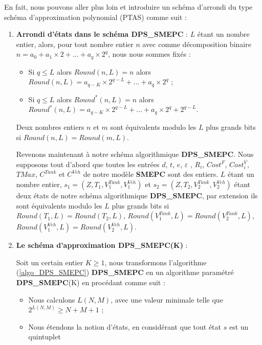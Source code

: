 En fait, nous pouvons aller plus loin et introduire un schéma d'arrondi du type schéma d'approximation polynomial (PTAS) comme suit : 
\begin{enumerate}
	\item \textbf{Arrondi d'états dans le schéma \textbf{DPS\_SMEPC}} : $L$ étant un nombre entier, alors, pour tout nombre entier $n$ avec comme décomposition binaire $n = a_0 + a_1 \times 2 + \dots + a_q \times 2^q$, nous nous sommes fixés :
	\begin{itemize}[label=$\square$]
		\item Si $q\leq L$ alors $Round(n, L)=n$ alors $Round(n, L)=a_{q-K}\times 2^{q-L}+ \dots + a_q\times 2^q$ ;
		\item Si $q\leq L$ alors $Round^*(n, L)=n$ alors $Round^*(n, L)=a_{q-K}\times 2^{q-L}+ \dots + a_q\times 2^q+2^{q-L}$.
	\end{itemize}
	Deux nombres entiers $n$ et $m$ sont équivalents modulo les $L$ plus grands bits si $Round(n, L) = Round(m, L)$.
	
	Revenons maintenant à notre schéma algorithmique \textbf{DPS\_SMEPC}. Nous supposons tout d'abord que toutes les entrées $d$, $t$, $e$, $\varepsilon$ , $R_i$, $Cost^F$, $Cost^V_i$, $TMax$, $C^{Tank}$ et $C^{Veh}$ de notre modèle \textbf{SMEPC} sont des entiers. $L$ étant un nombre entier, $s_1 = (Z, T_1, V^{Tank}_1, V^{Veh}_1)$ et $s_2 = (Z, T_2, V^{Tank}_2, V^{Veh}_2)$ étant deux états de notre schéma algorithmique \textbf{DPS\_SMEPC}, par extension ils sont équivalents modulo les $L$ plus grands bits si $Round(T_1, L) = Round(T_2, L)$, $Round(V^{Tank}_1, L) = Round(V^{Tank}_2, L)$, $Round(V^{Veh}_1, L) = Round(V^{Veh}_2, L)$.
	
	
	\item \textbf{Le schéma d'approximation \textbf{DPS\_SMEPC}(K)} : 
	
	Soit un certain entier $K\geq 1$, nous transformons l'algorithme (\ref{algo_DPS_SMEPC}) \textbf{DPS\_SMEPC} en un algorithme paramétré \textbf{DPS\_SMEPC}(K) en procédant comme suit :
	\begin{itemize}[label=$\square$]
		\item Nous calculons $L(N, M)$, avec une valeur minimale telle que $2^{L(N,M)}\geq N+M+1$ ; 
		\item Nous étendons la notion d'états, en considérant que tout état $s$ est un quintuplet 
		

\end{itemize}
\end{enumerate}
